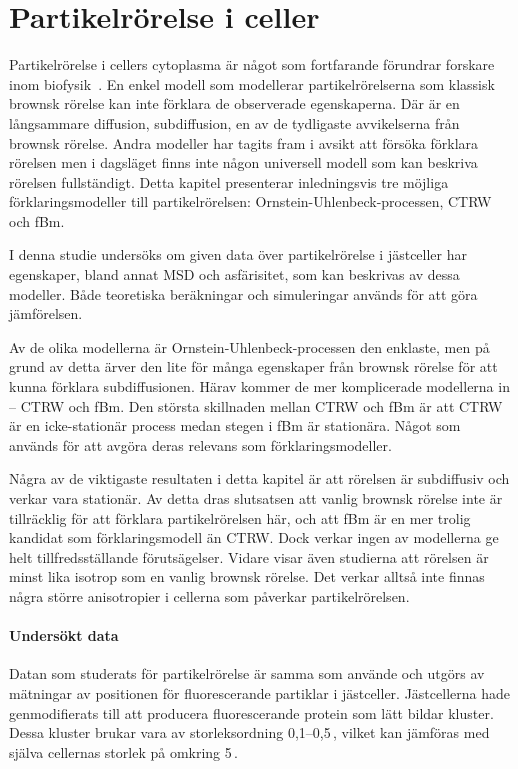 \chapter{Partikelrörelse i celler}

Partikelrörelse i cellers cytoplasma är något som fortfarande förundrar forskare inom biofysik~\cite{Hofling&Franosch2013}. En enkel modell som modellerar partikelrörelserna som klassisk brownsk rörelse kan inte förklara de observerade egenskaperna. Där är en långsammare diffusion, subdiffusion, en av de tydligaste avvikelserna från brownsk rörelse. Andra modeller har tagits fram i avsikt att försöka förklara rörelsen men i dagsläget finns inte någon universell modell som kan beskriva rörelsen fullständigt. 
Detta kapitel presenterar inledningsvis tre möjliga förklaringsmodeller till partikelrörelsen:  Ornstein-Uhlenbeck-processen, CTRW och fBm.


I denna studie undersöks om given data över partikelrörelse i jästceller har egenskaper, bland annat MSD och asfärisitet, som kan beskrivas av dessa modeller. Både teoretiska beräkningar och simuleringar används för att göra jämförelsen. 

Av de olika modellerna är Ornstein-Uhlenbeck-processen den enklaste, men på grund av detta ärver den lite för många egenskaper från brownsk rörelse för att kunna förklara subdiffusionen. Härav kommer de mer komplicerade modellerna in -- CTRW och fBm.
Den största skillnaden mellan CTRW och fBm är att CTRW är en icke-stationär process medan stegen i fBm är stationära. Något som används för att avgöra deras relevans som förklaringsmodeller. 

Några av de viktigaste resultaten i detta kapitel är att rörelsen är subdiffusiv och verkar vara stationär.
Av detta dras slutsatsen att vanlig brownsk rörelse inte är tillräcklig för att förklara partikelrörelsen här, och att fBm är en mer trolig kandidat som förklaringsmodell än CTRW. Dock verkar ingen av modellerna ge helt tillfredsställande förutsägelser.
Vidare visar även studierna att rörelsen är minst lika isotrop som en vanlig brownsk rörelse. Det verkar alltså inte finnas några större anisotropier i cellerna som påverkar partikelrörelsen.



\subsubsection{Undersökt data}
Datan som studerats för partikelrörelse är samma som \cite{Midtveldt_etal2016} använde och utgörs av mätningar av positionen för fluorescerande partiklar i jästceller. Jästcellerna hade genmodifierats till att producera fluorescerande protein som lätt bildar kluster. Dessa kluster brukar vara av storleksordning 0,1--0,5\,, vilket kan jämföras med själva cellernas storlek på omkring 5\,.


